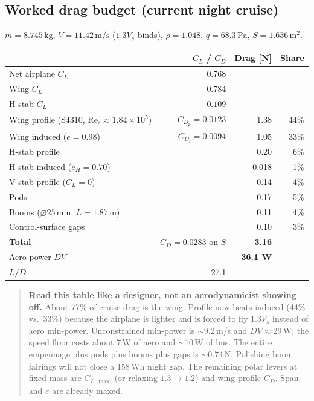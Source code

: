 \documentclass[11pt,letterpaper]{article}
\newenvironment{intuition}{\begin{quote}\small}{\end{quote}}
\begin{document}
\subsection{Worked drag budget (current night cruise)}
\label{sec:dragbudget}

$m = 8.745\,\mathrm{kg}$, $V = 11.42\,\mathrm{m/s}$ ($1.3 V_s$ binds), $\rho = 1.048$, $q = 68.3\,\mathrm{Pa}$, $S = 1.636\,\mathrm{m^2}$.

\begin{center}
\begin{tabular}{@{}lrrr@{}}
\toprule
 & $C_L$ / $C_D$ & Drag [N] & Share \\
\midrule
Net airplane $C_L$ & 0.768 & & \\
Wing $C_L$ & 0.784 & & \\
H-stab $C_L$ & $-0.109$ & & \\
Wing profile (S4310, $\mathrm{Re}_{\bar{c}}\approx 1.84\times 10^5$) & $C_{D_p}=0.0123$ & 1.38 & 44\% \\
Wing induced ($e=0.98$) & $C_{D_i}=0.0094$ & 1.05 & 33\% \\
H-stab profile & & 0.20 & 6\% \\
H-stab induced ($e_H=0.70$) & & 0.018 & 1\% \\
V-stab profile ($C_L=0$) & & 0.14 & 4\% \\
Pods & & 0.17 & 5\% \\
Booms ($\varnothing 25\,\mathrm{mm}$, $L=1.87\,\mathrm{m}$) & & 0.11 & 4\% \\
Control-surface gaps & & 0.10 & 3\% \\
\midrule
\textbf{Total} & $C_D=0.0283$ on $S$ & \textbf{3.16} & \\
Aero power $DV$ & & \textbf{36.1 W} & \\
$L/D$ & 27.1 & & \\
\bottomrule
\end{tabular}
\end{center}

\begin{intuition}
\textbf{Read this table like a designer, not an aerodynamicist showing off.} About 77\% of cruise drag is the wing. Profile now beats induced (44\% vs.\ 33\%) because the airplane is lighter and is forced to fly $1.3 V_s$ instead of aero min-power. Unconstrained min-power is $\sim$9.2\,m/s and $DV \approx 29\,\mathrm{W}$; the speed floor costs about $7\,\mathrm{W}$ of aero and $\sim$10\,W of bus. The entire empennage plus pods plus booms plus gaps is $\sim$0.74\,N. Polishing boom fairings will not close a 158\,Wh night gap. The remaining polar levers at fixed mass are $C_{L,\max}$ (or relaxing $1.3\to 1.2$) and wing profile $C_D$. Span and $e$ are already maxed.
\end{intuition}
\end{document}

